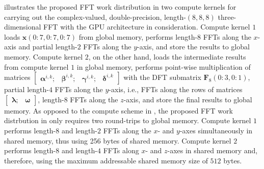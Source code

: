 \documentclass[11pt, onecolumn, journal,compsoc]{IEEEtran}
\theoremstyle{problemstyle}
\begin{document}
      
       illustrates the proposed FFT work distribution in two compute kernels for carrying out the complex-valued, double-precision, length-$(8,8,8)$ three-dimensional FFT with the GPU architecture in consideration. Compute kernel $1$ loads $\bm{x}(0 \colon 7,0 \colon 7,0 \colon 7)$ from global memory, performs length-$8$ FFTs along the $x$-axis and partial length-$2$ FFTs along the $y$-axis, and store the results to global memory. Compute kernel $2$, on the other hand, loads the intermediate results from compute kernel $1$ in global memory, performs point-wise multiplication of matrices $\begin{bmatrix} \bm{\alpha}^{i,k}; & \bm{\beta}^{i,k}; & \bm{\gamma}^{i,k}; & \bm{\delta}^{i,k} \end{bmatrix}$ with the DFT submatrix $\bm{F}_8(0:3,0:1)$, partial length-$4$ FFTs along the $y$-axis, i.e., FFTs along the rows of matrices $\begin{bmatrix} \bm{\lambda}; & \bm{\omega} \end{bmatrix}$, length-$8$ FFTs along the $z$-axis, and store the final results to global memory. As opposed to the compute scheme in , the proposed FFT work distrbution in  only requires two round-trips to global memory. Compute kernel $1$ performs length-$8$ and length-$2$ FFTs along the $x$- and $y$-axes simultaneously in shared memory, thus using 256 bytes of shared memory. Compute kernel $2$ performs length-$8$ and length-$4$ FFTs along $x$- and $z$-axes in shared memory and, therefore, using the maximum addressable shared memory size of $512$ bytes.
\end{document}
